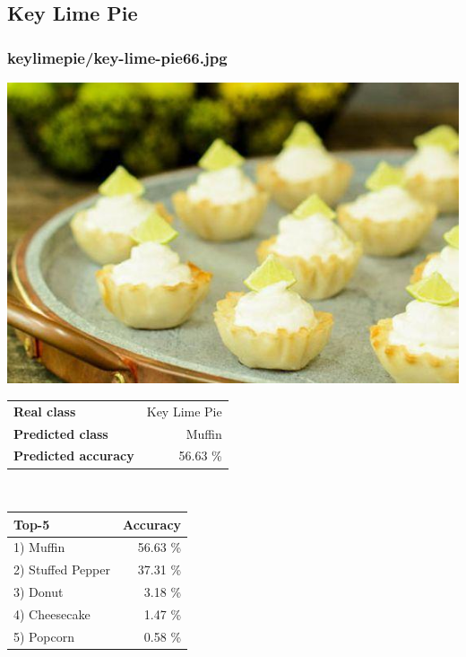 \subsection{Key Lime Pie}
    
\subsubsection{key\textunderscore lime\textunderscore pie/key-lime-pie66.jpg}

\begin{minipage}[t]{0.4\textwidth}
	\vspace{0pt}
	\includegraphics[width=\linewidth]{images/evaluation-images/key_lime_pie/key-lime-pie66.jpg}
\end{minipage}
\hfill
\begin{minipage}[t]{0.5\textwidth}
	\vspace{0pt}\raggedright
	\begin{tabularx}{\textwidth}{X r}
		\small \textbf{Real class} & \small Key Lime Pie\\
		\small \textbf{Predicted class} & \small Muffin\\
		\small \textbf{Predicted accuracy} & \small 56.63 \%
    \end{tabularx}\\
    
    \vspace{6pt}
	\begin{tabularx}{\textwidth}{X r}
        \small \textbf{Top-5} & \small \textbf{Accuracy} \\
        \hline
		\small 1) Muffin & \small 56.63 \%\\\small 2) Stuffed Pepper & \small 37.31 \%\\\small 3) Donut & \small 3.18 \%\\\small 4) Cheesecake & \small 1.47 \%\\\small 5) Popcorn & \small 0.58 \%
    \end{tabularx}
\end{minipage}
    
